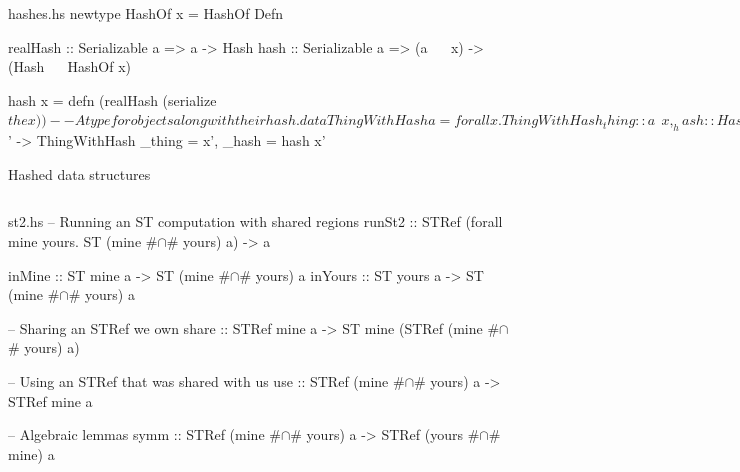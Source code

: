 \documentclass{beamer}
\begin{document}
\begin{filecontents*}{hashes.hs}
newtype HashOf x = HashOf Defn

realHash :: Serializable a =>  a       ->  Hash
hash     :: Serializable a => (a ~~ x) -> (Hash ~~ HashOf x)

hash x = defn (realHash (serialize $ the x))

-- A type for objects along with their hash.
data ThingWithHash a = forall x. ThingWithHash
  { _thing :: a    ~~ x
  , _hash  :: Hash ~~ HashOf x }

-- Use it like this:
hashIt :: Serializable a => a -> ThingWithHash a
hashIt x = name x $ \x' ->
  ThingWithHash { _thing = x', _hash = hash x' }
                          
    
\end{filecontents*}

\begin{frame}{Hashed data structures}
\inputminted{haskell}{hashes.hs}
\end{frame}

\begin{filecontents*}{st2.hs}
-- Running an ST computation with shared regions
runSt2  ::
  STRef (forall mine yours. ST (mine #$\cap$# yours) a) -> a

inMine  :: ST mine  a -> ST (mine #$\cap$# yours) a
inYours :: ST yours a -> ST (mine #$\cap$# yours) a

-- Sharing an STRef we own
share  :: STRef mine a -> ST mine (STRef (mine #$\cap$# yours) a)

-- Using an STRef that was shared with us
use    :: STRef (mine #$\cap$# yours) a -> STRef mine a

-- Algebraic lemmas
symm   :: STRef (mine #$\cap$# yours) a -> STRef (yours #$\cap$# mine) a

\end{filecontents*}

\begin{frame}{}\end{frame}
\end{document}
